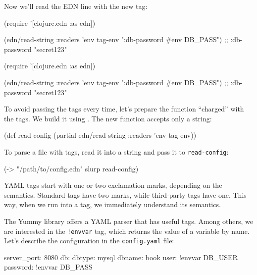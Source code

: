 \fi

\noindent
Now we'll read the EDN line with the new tag:

\ifnarrow

\begin{clojure}
(require '[clojure.edn :as edn])

(edn/read-string
  {:readers {'env tag-env}}
  "{:db-password #env DB_PASS}")
;; {:db-password "secret123"}
\end{clojure}

\else

\begin{clojure}
(require '[clojure.edn :as edn])

(edn/read-string {:readers {'env tag-env}}
                 "{:db-password #env DB_PASS}")
;; {:db-password "secret123"}
\end{clojure}

\fi

To avoid passing the tags every time, let's prepare the  function ``charged'' with the tags. We build it using . The new function accepts only a string:

\begin{clojure}
(def read-config
  (partial edn/read-string
           {:readers {'env tag-env}}))
\end{clojure}

To parse a file with tags, read it into a string and pass it to \verb|read-config|:

\begin{clojure}
(-> "/path/to/config.edn"
    slurp
    read-config)
\end{clojure}

YAML tags start with one or two exclamation marks, depending on the semantics. Standard tags have two marks, while third-party tags have one. This way, when we run into a tag, we immediately understand its semantics.


The Yummy library offers a YAML parser that has useful tags. Among others, we are interested in the \verb|!envvar| tag, which returns the value of a variable by name. Let's describe the configuration in the \verb|config.yaml| file:

\begin{yaml}
server_port: 8080
db:
  dbtype:   mysql
  dbname:   book
  user:     !envvar DB_USER
  password: !envvar DB_PASS
\end{yaml}

